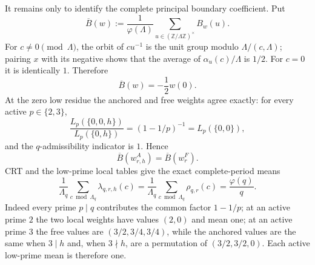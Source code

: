\documentclass[11pt]{article}
\theoremstyle{definition}
\theoremstyle{remark}
\newcommand{\1}{\mathbf 1}
\newcommand{\ph}{\varphi}
\begin{document}
It remains only to identify the complete principal boundary coefficient.  Put
\[
\overline B(w):=\frac1{\ph(\Lambda)}
\sum_{u\in(\mathbb Z/\Lambda\mathbb Z)^\times}B_w(u).
\]
For $c\ne0\pmod\Lambda$, the orbit of $cu^{-1}$ is the unit group modulo
$\Lambda/(c,\Lambda)$; pairing $x$ with its negative shows that the average of
$\alpha_u(c)/\Lambda$ is $1/2$.  For $c=0$ it is identically $1$.  Therefore
\begin{equation}\label{eq:Bbar-zero-residue}
\boxed{\overline B(w)=-\frac12w(0).}
\end{equation}
At the zero low residue the anchored and free weights agree exactly:
for every active $p\in\{2,3\}$,
\[
\frac{L_p(\{0,0,h\})}{L_p(\{0,h\})}
=(1-1/p)^{-1}=L_p(\{0,0\}),
\]
and the $q$-admissibility indicator is $1$.  Hence
\begin{equation}\label{eq:Bbar-anchored-free}
\overline B(w^A_{r,h})=\overline B(w^F_r).
\end{equation}
CRT and the low-prime local tables give the exact complete-period means
\begin{equation}\label{eq:principal-low-mean}
\frac1{\Lambda_q}\sum_{c\bmod\Lambda_q}\lambda_{q,r,h}(c)
=\frac1{\Lambda_q}\sum_{c\bmod\Lambda_q}\rho_{q,r}(c)
=\frac{\ph(q)}q.
\end{equation}
Indeed every prime $p\mid q$ contributes the common factor $1-1/p$; at an
active prime $2$ the two local weights have values $(2,0)$ and mean one; at
an active prime $3$ the free values are $(3/2,3/4,3/4)$, while the anchored
values are the same when $3\mid h$ and, when $3\nmid h$, are a permutation
of $(3/2,3/2,0)$.  Each active low-prime mean is therefore one.
\end{document}
